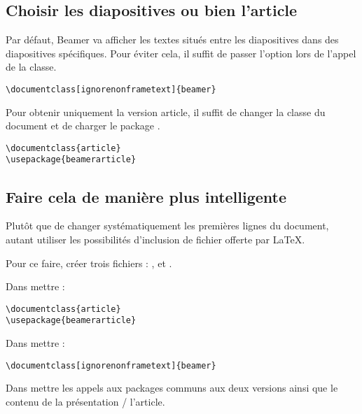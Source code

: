 \subsection{Choisir les diapositives ou bien l'article}

Par défaut, Beamer va afficher les textes situés entre les diapositives dans des diapositives spécifiques. Pour éviter cela, il suffit de passer l'option  lors de l'appel de la classe.

\begin{verbatim}
\documentclass[ignorenonframetext]{beamer}
\end{verbatim}

Pour obtenir uniquement la version article, il suffit de changer la classe du document et de charger le package .

\begin{verbatim}
\documentclass{article}
\usepackage{beamerarticle}
\end{verbatim}

\subsection{Faire cela de manière plus intelligente}

Plutôt que de changer systématiquement les premières lignes du document, autant utiliser les possibilités d'inclusion de fichier offerte par \LaTeX{}. 

Pour ce faire, créer trois fichiers :  ,  et .

Dans  mettre :

\begin{verbatim}
\documentclass{article}
\usepackage{beamerarticle}

\end{verbatim}

Dans  mettre :

\begin{verbatim}
\documentclass[ignorenonframetext]{beamer}

\end{verbatim}

Dans  mettre les appels aux packages communs aux deux versions ainsi que le contenu de la présentation / l'article.



